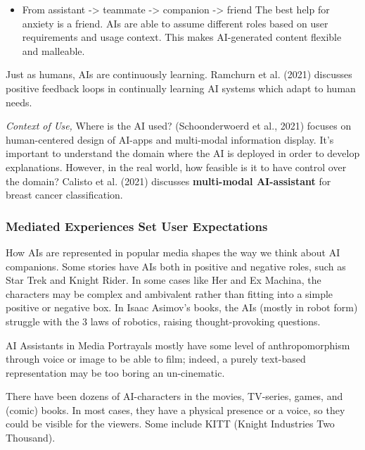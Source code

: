 \documentclass[
  letterpaper,
  DIV=11,
  numbers=noendperiod]{scrartcl}
\providecommand{\tightlist}{%
  \setlength{\itemsep}{0pt}\setlength{\parskip}{0pt}}\usepackage{longtable,booktabs,array}
\begin{document}
\begin{itemize}
\tightlist
\item
  From assistant -\textgreater{} teammate -\textgreater{} companion
  -\textgreater{} friend The best help for anxiety is a friend. AIs are
  able to assume different roles based on user requirements and usage
  context. This makes AI-generated content flexible and malleable.
\end{itemize}

Just as humans, AIs are continuously learning. Ramchurn et al. (2021)
discusses positive feedback loops in continually learning AI systems
which adapt to human needs.

\emph{Context of Use,} Where is the AI used? (Schoonderwoerd et al.,
2021) focuses on human-centered design of AI-apps and multi-modal
information display. It's important to understand the domain where the
AI is deployed in order to develop explanations. However, in the real
world, how feasible is it to have control over the domain? Calisto et
al. (2021) discusses \textbf{multi-modal AI-assistant} for breast cancer
classification.

\subsubsection{Mediated Experiences Set User
Expectations}\label{mediated-experiences-set-user-expectations}

How AIs are represented in popular media shapes the way we think about
AI companions. Some stories have AIs both in positive and negative
roles, such as Star Trek and Knight Rider. In some cases like Her and Ex
Machina, the characters may be complex and ambivalent rather than
fitting into a simple positive or negative box. In Isaac Asimov's books,
the AIs (mostly in robot form) struggle with the 3 laws of robotics,
raising thought-provoking questions.

AI Assistants in Media Portrayals mostly have some level of
anthropomorphism through voice or image to be able to film; indeed, a
purely text-based representation may be too boring an un-cinematic.

There have been dozens of AI-characters in the movies, TV-series, games,
and (comic) books. In most cases, they have a physical presence or a
voice, so they could be visible for the viewers. Some include KITT
(Knight Industries Two Thousand).
\end{document}

